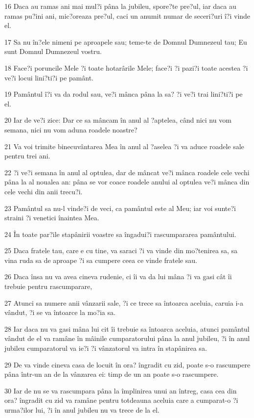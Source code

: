 \par 16 Daca au ramas ani mai mul?i pâna la jubileu, spore?te pre?ul, iar daca au ramas pu?ini ani, mic?oreaza pre?ul, caci un anumit numar de seceri?uri î?i vinde el.
\par 17 Sa nu în?ele nimeni pe aproapele sau; teme-te de Domnul Dumnezeul tau; Eu sunt Domnul Dumnezeul vostru.
\par 18 Face?i poruncile Mele ?i toate hotarârile Mele; face?i ?i pazi?i toate acestea ?i ve?i locui lini?ti?i pe pamânt.
\par 19 Pamântul î?i va da rodul sau, ve?i mânca pâna la sa? ?i ve?i trai lini?ti?i pe el.
\par 20 Iar de ve?i zice: Dar ce sa mâncam în anul al ?aptelea, când nici nu vom semana, nici nu vom aduna roadele noastre?
\par 21 Va voi trimite binecuvântarea Mea în anul al ?aselea ?i va aduce roadele sale pentru trei ani.
\par 22 ?i ve?i semana în anul al optulea, dar de mâncat ve?i mânca roadele cele vechi pâna la al noualea an: pâna se vor coace roadele anului al optulea ve?i mânca din cele vechi din anii trecu?i.
\par 23 Pamântul sa nu-l vinde?i de veci, ca pamântul este al Meu; iar voi sunte?i straini ?i venetici înaintea Mea.
\par 24 În toate par?ile stapânirii voastre sa îngadui?i rascumpararea pamântului.
\par 25 Daca fratele tau, care e cu tine, va saraci ?i va vinde din mo?tenirea sa, sa vina ruda sa de aproape ?i sa cumpere ceea ce vinde fratele sau.
\par 26 Daca însa nu va avea cineva rudenie, ci îi va da lui mâna ?i va gasi cât îi trebuie pentru rascumparare,
\par 27 Atunci sa numere anii vânzarii sale, ?i ce trece sa întoarca aceluia, caruia i-a vândut, ?i se va întoarce la mo?ia sa.
\par 28 Iar daca nu va gasi mâna lui cit îi trebuie sa întoarca aceluia, atunci pamântul vândut de el va ramâne în mâinile cumparatorului pâna la anul jubileu, ?i în anul jubileu cumparatorul va ie?i ?i vânzatorul va intra în stapânirea sa.
\par 29 De va vinde cineva casa de locuit în ora? îngradit cu zid, poate s-o rascumpere pâna într-un an de la vânzarea ei: timp de un an poate s-o rascumpere.
\par 30 Iar de nu se va rascumpara pâna la împlinirea unui an întreg, casa cea din ora? îngradit cu zid va ramâne pentru totdeauna aceluia care a cumparat-o ?i urma?ilor lui, ?i în anul jubileu nu va trece de la el.
